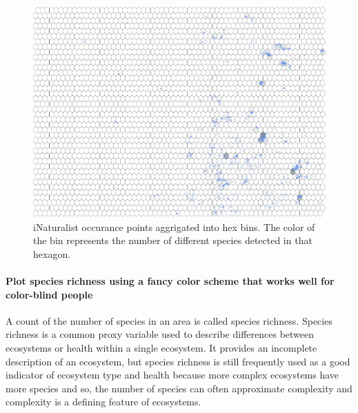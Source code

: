 \documentclass[
]{article}
\newenvironment{Shaded}{\begin{snugshade}}{\end{snugshade}}
\newcommand{\DataTypeTok}[1]{\textcolor[rgb]{0.13,0.29,0.53}{#1}}
\newcommand{\DecValTok}[1]{\textcolor[rgb]{0.00,0.00,0.81}{#1}}
\newcommand{\FloatTok}[1]{\textcolor[rgb]{0.00,0.00,0.81}{#1}}
\newcommand{\KeywordTok}[1]{\textcolor[rgb]{0.13,0.29,0.53}{\textbf{#1}}}
\newcommand{\NormalTok}[1]{#1}
\newcommand{\OperatorTok}[1]{\textcolor[rgb]{0.81,0.36,0.00}{\textbf{#1}}}
\newcommand{\OtherTok}[1]{\textcolor[rgb]{0.56,0.35,0.01}{#1}}
\newcommand{\StringTok}[1]{\textcolor[rgb]{0.31,0.60,0.02}{#1}}
\begin{document}
\begin{figure}
\centering
\includegraphics{Earth_Lab_application_files/figure-latex/unnamed-chunk-8-1.pdf}
\caption{iNaturalist occurance points aggrigated into hex bins. The
color of the bin represents the number of different species detected in
that hexagon.}
\end{figure}

\hypertarget{plot-species-richness-using-a-fancy-color-scheme-that-works-well-for-color-blind-people}{%
\paragraph{Plot species richness using a fancy color scheme that works
well for color-blind
people}\label{plot-species-richness-using-a-fancy-color-scheme-that-works-well-for-color-blind-people}}

A count of the number of species in an area is called species richness.
Species richness is a common proxy variable used to describe differences
between ecosystems or health within a single ecosystem. It provides an
incomplete description of an ecosystem, but species richness is still
frequently used as a good indicator of ecosystem type and health because
more complex ecosystems have more species and so, the number of species
can often approximate complexity and complexity is a defining feature of
ecosystems.

\begin{Shaded}
\end{Shaded}
\end{document}
